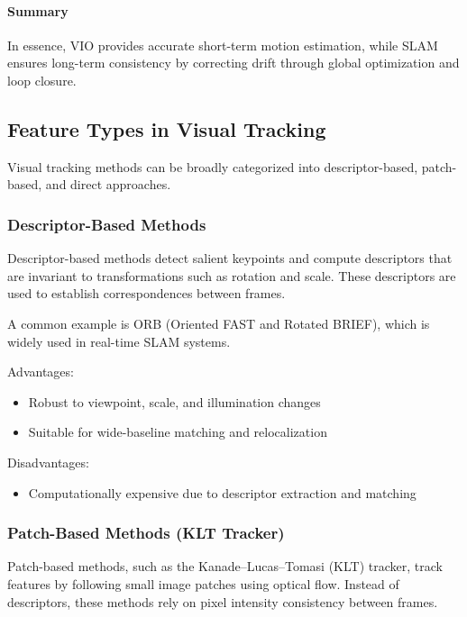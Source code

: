 \documentclass[english, cd=nocolor, cdfont=off, fontsize=11pt]{tudscrreprt}
\begin{document}
\paragraph{Summary}
In essence, VIO provides accurate short-term motion estimation, while SLAM ensures long-term consistency by correcting drift through global optimization and loop closure.

\subsection{Feature Types in Visual Tracking}

Visual tracking methods can be broadly categorized into descriptor-based, patch-based, and direct approaches.

\subsubsection{Descriptor-Based Methods}

Descriptor-based methods detect salient keypoints and compute descriptors that are invariant to transformations such as rotation and scale. These descriptors are used to establish correspondences between frames.

A common example is ORB (Oriented FAST and Rotated BRIEF), which is widely used in real-time SLAM systems.

Advantages:
\begin{itemize}
    \item Robust to viewpoint, scale, and illumination changes
    \item Suitable for wide-baseline matching and relocalization
\end{itemize}

Disadvantages:
\begin{itemize}
    \item Computationally expensive due to descriptor extraction and matching
\end{itemize}

\subsubsection{Patch-Based Methods (KLT Tracker)}

Patch-based methods, such as the Kanade--Lucas--Tomasi (KLT) tracker, track features by following small image patches using optical flow. Instead of descriptors, these methods rely on pixel intensity consistency between frames.
\end{document}
